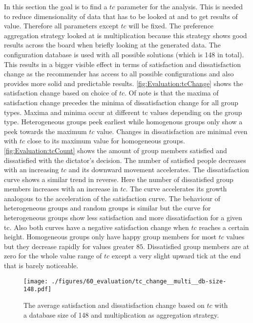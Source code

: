 In this section the goal is to find a $tc$ parameter for the analysis. This is needed to reduce dimensionality of data that has to be looked at and to get results of value. Therefore all parameters except $tc$ will be fixed. The preference aggregation strategy looked at is multiplication because this strategy shows good results across the board when briefly looking at the generated data. The configuration database is used with all possible solutions (which is 148 in total). This results in a bigger visible effect in terms of satisfaction and dissatisfaction change as the recommender has access to all possible configurations and also provides more solid and predictable results. \autoref{fig:Evaluation:tcChange} shows the satisfaction change based on choice of $tc$. Of note is that the maxima of satisfaction change precedes the minima of dissatisfaction change for all group types. Maxima and minima occur at different tc values depending on the group type. Heterogeneous groups peek earliest while homogenous groups only show a peek towards the maximum $tc$ value. Changes in dissatisfaction are minimal even with $tc$ close to its maximum value for homogeneous groups. \autoref{fig:Evaluation:tcCount} shows the amount of group members satisfied and dissatisfied with the dictator's decision. The number of satisfied people decreases with an increasing $tc$ and its downward movement accelerates. The dissatisfaction curve shows a similar trend in reverse. Here the number of dissatisfied group members increases with an increase in $tc$. The curve accelerates its growth analogous to the acceleration of the satisfaction curve. The behaviour of heterogeneous groups and random groups is similar but the curve for heterogeneous groups show less satisfaction and more dissatisfaction for a given tc. Also both curves have a negative satisfaction change when $tc$ reaches a certain height. Homogeneous groups only have happy group members for most $tc$ values but they decrease rapidly for values greater $85$. Dissatisfied group members are at zero for the whole value range of $tc$ except a very slight upward tick at the end that is barely noticeable.

\begin{figure}
    \centering
    \texttt{[image: ./figures/60\_evaluation/tc\_change\_\_multi\_\_db-size-148.pdf]}
    \caption{The average satisfaction and dissatisfaction change based on $tc$ with a database size of 148 and multiplication as aggregation strategy.}
    \label{fig:Evaluation:tcChange}
\end{figure}

